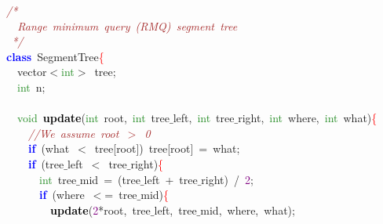 
{\ttfamily \raggedright {
\noindent
\mbox{}\textit{\textcolor{Brown}{/*}} \\
\mbox{}\textit{\textcolor{Brown}{\ \ Range\ minimum\ query\ (RMQ)\ segment\ tree}} \\
\mbox{}\textit{\textcolor{Brown}{\ */}} \\
\mbox{}\textbf{\textcolor{Blue}{class}}\ SegmentTree\textcolor{Red}{\{} \\
\mbox{}\ \ vector\textcolor{BrickRed}{$<$}\textcolor{ForestGreen}{int}\textcolor{BrickRed}{$>$}\ tree\textcolor{BrickRed}{;} \\
\mbox{}\ \ \textcolor{ForestGreen}{int}\ n\textcolor{BrickRed}{;} \\
\mbox{} \\
\mbox{}\ \ \textcolor{ForestGreen}{void}\ \textbf{\textcolor{Black}{update}}\textcolor{BrickRed}{(}\textcolor{ForestGreen}{int}\ root\textcolor{BrickRed}{,}\ \textcolor{ForestGreen}{int}\ tree$\_$left\textcolor{BrickRed}{,}\ \textcolor{ForestGreen}{int}\ tree$\_$right\textcolor{BrickRed}{,}\ \textcolor{ForestGreen}{int}\ where\textcolor{BrickRed}{,}\ \textcolor{ForestGreen}{int}\ what\textcolor{BrickRed}{)}\textcolor{Red}{\{} \\
\mbox{}\ \ \ \ \textit{\textcolor{Brown}{//We\ assume\ root\ $>$\ 0}} \\
\mbox{}\ \ \ \ \textbf{\textcolor{Blue}{if}}\ \textcolor{BrickRed}{(}what\ \textcolor{BrickRed}{$<$}\ tree\textcolor{BrickRed}{[}root\textcolor{BrickRed}{])}\ tree\textcolor{BrickRed}{[}root\textcolor{BrickRed}{]}\ \textcolor{BrickRed}{=}\ what\textcolor{BrickRed}{;} \\
\mbox{}\ \ \ \ \textbf{\textcolor{Blue}{if}}\ \textcolor{BrickRed}{(}tree$\_$left\ \textcolor{BrickRed}{$<$}\ tree$\_$right\textcolor{BrickRed}{)}\textcolor{Red}{\{} \\
\mbox{}\ \ \ \ \ \ \textcolor{ForestGreen}{int}\ tree$\_$mid\ \textcolor{BrickRed}{=}\ \textcolor{BrickRed}{(}tree$\_$left\ \textcolor{BrickRed}{+}\ tree$\_$right\textcolor{BrickRed}{)}\ \textcolor{BrickRed}{/}\ \textcolor{Purple}{2}\textcolor{BrickRed}{;} \\
\mbox{}\ \ \ \ \ \ \textbf{\textcolor{Blue}{if}}\ \textcolor{BrickRed}{(}where\ \textcolor{BrickRed}{$<$=}\ tree$\_$mid\textcolor{BrickRed}{)}\textcolor{Red}{\{} \\
\mbox{}\ \ \ \ \ \ \ \ \textbf{\textcolor{Black}{update}}\textcolor{BrickRed}{(}\textcolor{Purple}{2}\textcolor{BrickRed}{*}root\textcolor{BrickRed}{,}\ tree$\_$left\textcolor{BrickRed}{,}\ tree$\_$mid\textcolor{BrickRed}{,}\ where\textcolor{BrickRed}{,}\ what\textcolor{BrickRed}{);} \\
}}
